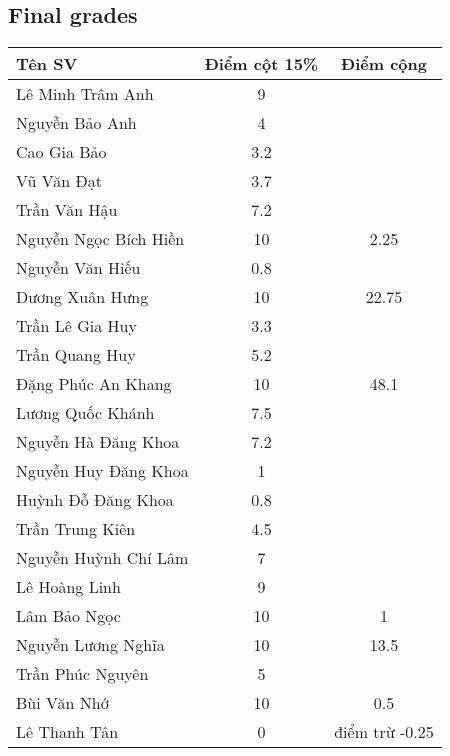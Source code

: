 \documentclass{article}
\begin{document}
\subsection{Final grades}

\begin{table}[H]
    \centering
    \begin{tabular}{|l|c|c|}
        \hline
        {\bf Tên SV} & {\bf Điểm cột 15\%} & {\bf Điểm cộng} \\
        \hline
        Lê Minh Trâm Anh & 9 &  \\
        \hline
        Nguyễn Bảo Anh & 4 &  \\
        \hline
        Cao Gia Bảo & 3.2 &  \\
        \hline
        Vũ Văn Đạt & 3.7 &  \\
        \hline
        Trần Văn Hậu & 7.2 &  \\
        \hline
        Nguyễn Ngọc Bích Hiền & 10 & 2.25 \\
        \hline
        Nguyễn Văn Hiếu & 0.8 &  \\
        \hline
        Dương Xuân Hưng & 10 & 22.75 \\
        \hline
        Trần Lê Gia Huy & 3.3 &  \\
        \hline
        Trần Quang Huy & 5.2 &  \\
        \hline
        Đặng Phúc An Khang & 10 & 48.1 \\
        \hline
        Lương Quốc Khánh & 7.5 &  \\
        \hline
        Nguyễn Hà Đăng Khoa & 7.2 &  \\
        \hline
        Nguyễn Huy Đăng Khoa & 1 &  \\
        \hline
        Huỳnh Đỗ Đăng Khoa & 0.8 &  \\
        \hline
        Trần Trung Kiên & 4.5 &  \\
        \hline
        Nguyễn Huỳnh Chí Lâm & 7 &  \\
        \hline
        Lê Hoàng Linh & 9 &  \\
        \hline
        Lâm Bảo Ngọc & 10 & 1 \\
        \hline
        Nguyễn Lương Nghĩa & 10 & 13.5 \\
        \hline
        Trần Phúc Nguyên & 5 &  \\
        \hline
        Bùi Văn Nhớ & 10 & 0.5 \\
        \hline
        Lê Thanh Tân & 0 & điểm trừ -0.25 \\

\end{tabular}
\end{table}
\end{document}
